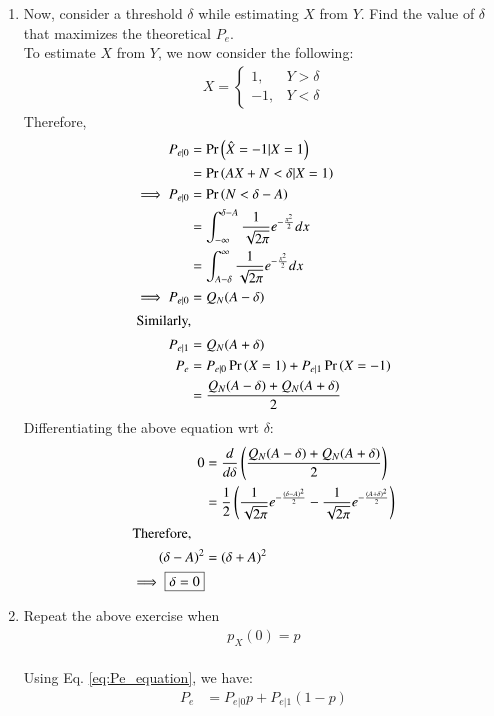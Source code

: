 \documentclass[journal,12pt,twocolumn]{IEEEtran}
\renewcommand\thesection{\arabic{section}}
\begin{document}
\begin{enumerate}[label=\thesection.\arabic*
,ref=\thesection.\theenumi]
\begin{enumerate}[label=\thesection.\arabic*
,ref=\thesection.\theenumi]
\begin{figure}[!h]
\caption{$P_e(A)$ with semilog-y axis}
\label{fig:5.6}
\end{figure}
\item Now, consider a threshold $\delta$  while estimating $X$ from $Y$. Find the value of $\delta$ that maximizes the theoretical $P_e$.
\\
\solution
To estimate $X$ from $Y$, we now consider the following:
\begin{align}
    X = 
    \begin{cases}
        1, & Y > \delta \\
        -1, & Y < \delta
    \end{cases}
\end{align}
Therefore,
\begin{align}
P_{e|0} &= \Pr\left(\hat{X} = -1 | X = 1\right) \\
&= \Pr\left(AX+N < \delta | X = 1\right) \\
\implies P_{e|0}&= \Pr\left(N < \delta - A\right) \\
&= \int _{-\infty} ^{\delta - A} \frac{1}{\sqrt{2\pi}} e^{-\frac{x^2}{2}} dx \\
&= \int _{A - \delta} ^{\infty} \frac{1}{\sqrt{2\pi}} e^{-\frac{x^2}{2}} dx \\
\implies P_{e|0}&= Q_N(A - \delta) \\
\intertext{Similarly,}
P_{e|1} &= Q_N(A+\delta) \\
\label{eq:Pe_equation}
P_e &= P_{e|0} \Pr\left(X = 1\right) + P_{e|1} \Pr\left(X = -1\right) \\
&= \frac{Q_N(A - \delta) + Q_N(A + \delta)}{2} 
\end{align}
Differentiating the above equation wrt $\delta$:
\begin{align}
0 &= \frac{d}{d\delta} \left(\frac{Q_N(A - \delta) + Q_N(A + \delta)}{2}\right) \\
&= \frac{1}{2} \left(\frac{1}{\sqrt{2\pi}} e^{-\frac{(\delta - A)^2}{2}} - \frac{1}{\sqrt{2\pi}} e^{-\frac{(A + \delta)^2}{2}} \right) \\
\intertext{Therefore,}
(\delta - A)^2 &= (\delta + A)^2 \\
\implies \boxed{\delta = 0}
\end{align}
\item Repeat the above exercise when 
    \begin{align}
        p_{X}(0) = p
    \end{align}
\\
\solution
Using Eq. \eqref{eq:Pe_equation}, we have:
\begin{align}
    P_e &= P_{e|0} p+ P_{e|1} (1-p) \\

\end{align}
\end{enumerate}
\end{enumerate}
\end{document}
